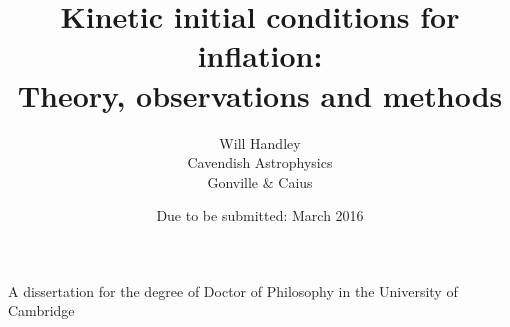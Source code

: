 \title{Kinetic initial conditions for inflation:\\ {\large Theory, observations and methods}}

\author{Will Handley\\
Cavendish Astrophysics \\
Gonville \& Caius}
\date{Due to be submitted: March 2016}

\maketitle

\begin{center}
  \ifdefined\lightweight
  \else
  
  \fi

  A dissertation for the degree of Doctor of Philosophy
  in the University of Cambridge 
\end{center}

